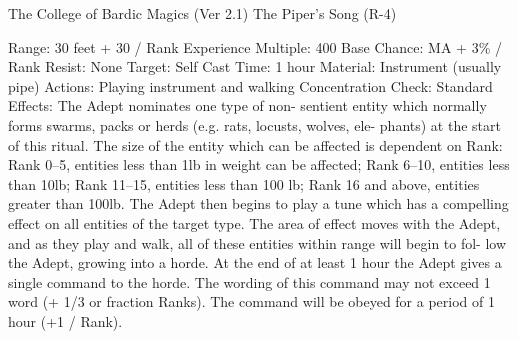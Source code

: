 \begin{Chapter}{The College of Bardic Magics (Ver 2.1)}
The Piper’s Song (R-4) 

Range: 30 feet + 30 / Rank 
Experience Multiple: 400 
Base Chance: MA + 3\% / Rank 
Resist: None 
Target: Self 
Cast Time: 1 hour 
Material: Instrument (usually pipe) 
Actions: Playing instrument and walking 
Concentration Check: Standard 
Effects:  The  Adept  nominates  one  type  of  non-
sentient  entity  which  normally  forms  swarms, 
packs  or  herds  (e.g.  rats,  locusts,  wolves,  ele-
phants)  at  the  start  of  this  ritual.  The  size  of  the 
entity which can be affected is dependent on Rank: 
Rank  0–5,  entities  less  than  1lb  in  weight  can  be 
affected;  Rank  6–10,  entities  less  than  10lb;  Rank 
11–15,  entities  less  than  100  lb;  Rank  16  and 
above,  entities  greater  than 100lb.  The  Adept  then 
begins to play a tune which has a compelling effect 
on all entities of the target type. The area of effect 
moves  with the Adept, and as they play and walk, 
all  of  these  entities  within  range  will  begin  to  fol-
low the Adept, growing into a horde. At the end of 
at  least  1  hour  the  Adept  gives  a  single  command 
to  the  horde.  The  wording  of  this  command  may 
not  exceed  1  word  (+  1/3  or  fraction  Ranks).  The 
command will be obeyed for a period of 1 hour (+1 
/ Rank). 

\end{Chapter}
